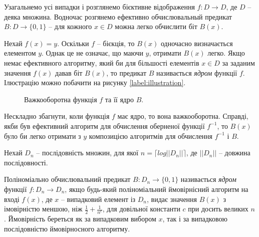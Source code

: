 Узагальнемо усі випадки і розглянемо бієктивне відображення $f: D \rightarrow D$, де $D$ -- деяка множина. Водночас розгянемо ефективно обчислювальный предикат $B: D \rightarrow \{0,1\}$ -- для кожного $x \in D$ можна легко обчислити біт $B(x)$. \par 
Нехай $f(x)=y.$ Оскільки $f$ -- бієкція, то $B(x)$ одночасно визначається елементом $y$. Однак це не означає, що маючи $y$, отримати $B(x)$ легко. Якщо немає ефективного алгоритму, який би для більшості елементів $x\in D$ за заданим значення $f(x)$ давав біт $B(x)$, то предикат $B$ називається \textit{ядром} функції $f$. Ілюстрацію можно побачити на рисунку \eqref{label:illustration}.

\begin{figure}[h]
\begin{center}


\end{center}
\caption{Важкооборотна функція $f$ та її ядро $B$.}
\end{figure}\label{label:illustration}

Нескладно збагнути, коли функція $f$ має ядро, то вона важкооборотна. Справді, якби був ефективний алгоритм для обчислення оберненої функції $f^{-1}$, то $B(x)$ було би легко отримати з $y$ композицією алгоритмів для обчислення $f^{-1}$ і $B$. \par 

Нехай $D_n$ -- послідовність множин, для якої $n = \lceil log||D_n||\rceil$, де $||D_n||$ -- довжина послідовності. 

\begin{mydef}
Поліноміально обчислювальний предикат $B: D_n \rightarrow \{0,1\}$ називається \textit{ядром} функції $f: D_n \rightarrow D_n$, якщо будь-який поліноміальний ймовірнісний алгоритм на вході $f(x)$, де  $x$ -- випадковий елемент із $D_n$, видає значення  $B(x)$ з імовірністю меншою, ніж $\frac{1}{2}+\frac{1}{n^c}$, для довільної константи  $c$ при досить великих  $n$. Ймовірність береться як за випадковим вибором  $x$, так і за випадковою послідовністю ймовірносного алгоритму.   \par 
\end{mydef}

